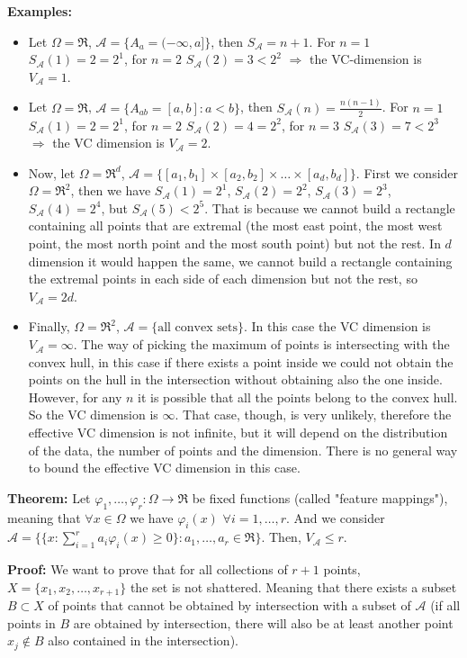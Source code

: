 \documentclass[11pt, english]{article}
\begin{document}
\textbf{Examples:}
\begin{itemize}
	\item Let $\Omega=\Re$, $\mathcal{A}=\{A_a=(-\infty,a]\}$, then $S_{\mathcal{A}}=n+1$. For $n=1$ $S_{\mathcal{A}}(1)=2=2^1$, for $n=2$ $S_{\mathcal{A}}(2)=3<2^2$ $\Longrightarrow$ the VC-dimension is $V_{\mathcal{A}}=1$.
	\item Let $\Omega=\Re$, $\mathcal{A}=\{A_{ab}=[a,b]: a<b\}$, then $S_{\mathcal{A}}(n)=\frac{n(n-1)}{2}$. For $n=1$ $S_{\mathcal{A}}(1)=2=2^1$, for $n=2$ $S_{\mathcal{A}}(2)=4=2^2$, for $n=3$ $S_{\mathcal{A}}(3)=7<2^3$ $\Longrightarrow$ the VC dimension is $V_{\mathcal{A}}=2$.
	\item Now, let $\Omega=\Re^d$, $\mathcal{A}=\{[a_1,b_1]\times[a_2,b_2]\times\dots \times[a_d,b_d]\}$. First we consider $\Omega=\Re^2$, then we have $S_{\mathcal{A}}(1)=2^1$, $S_{\mathcal{A}}(2)=2^2$, $S_{\mathcal{A}}(3)=2^3$, $S_{\mathcal{A}}(4)=2^4$, but $S_{\mathcal{A}}(5)<2^5$. That is because we cannot build a rectangle containing all points that are extremal (the most east point, the most west point, the most north point and the most south point) but not the rest. In $d$ dimension it would happen the same, we cannot build a rectangle containing the extremal points in each side of each dimension but not the rest, so $V_{\mathcal{A}}=2d$.
	\item Finally, $\Omega=\Re^2$, $\mathcal{A}=\{\text{all convex sets}\}$. In this case the VC dimension is $V_{\mathcal{A}}=\infty$. The way of picking the maximum of points is intersecting with the convex hull, in this case if there exists a point inside we could not obtain the points on the hull in the intersection without obtaining also the one inside. However, for any $n$ it is possible that all the points belong to the convex hull. So the VC dimension is $\infty$. That case, though, is very unlikely, therefore the effective VC dimension is not infinite, but it will depend on the distribution of the data, the number of points and the dimension. There is no general way to bound the effective VC dimension in this case.
\end{itemize} 
\textbf{Theorem:} Let $\varphi_1,\dots,\varphi_r:\Omega\longrightarrow\Re$ be fixed functions (called "feature mappings"), meaning that $\forall x\in \Omega$ we have $\varphi_i(x)$ $\forall i=1,\dots,r$. And we consider $\mathcal{A}=\{\{x:\sum\limits_{i=1}^ra_i\varphi_i(x)\geq 0\}:a_1,\dots,a_r\in\Re\}$. Then, $V_{\mathcal{A}}\leq r$. 

\textbf{Proof:} We want to prove that for all collections of $r+1$ points, $X=\{x_1,x_2,\dots,x_{r+1}\}$ the set is not shattered. Meaning that there exists a subset $B\subset X$ of points that cannot be obtained by intersection with a subset of $\mathcal{A}$ (if all points in $B$ are obtained by intersection, there will also be at least another point $x_j\notin B$ also contained in the intersection).\\
\end{document}
